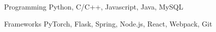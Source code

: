 

\begin{cvskills}


\cvskill
{Programming} %
{Python, C/C++, Javascript, Java, MySQL} %

\cvskill
  {Frameworks} %
  {PyTorch, Flask, Spring, Node.js, React, Webpack, Git} %
  

\end{cvskills}
